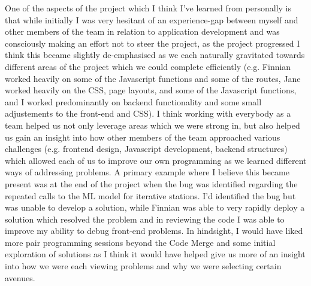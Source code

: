 \documentclass{scrreprt}
\begin{document}
One of the aspects of the project which I think I've learned from personally is that while initially I was very hesitant of an experience-gap between myself and other members of the team in relation to application development and was consciously making an effort not to steer the project, as the project progressed I think this became slightly de-emphasised as we each naturally gravitated towards different areas of the project which we could complete efficiently (e.g. Finnian worked heavily on some of the Javascript functions and some of the routes, Jane worked heavily on the CSS, page layouts, and some of the Javascript functions, and I worked predominantly on backend functionality and some small adjustements to the front-end and CSS). I think working with everybody as a team helped us not only leverage areas which we were strong in, but also helped us gain an insight into how other members of the team approached various challenges (e.g. frontend design, Javascript development, backend structures) which allowed each of us to improve our own programming as we learned different ways of addressing problems. A primary example where I believe this became present was at the end of the project when the bug was identified regarding the repeated calls to the ML model for iterative stations. I'd identified the bug but was unable to develop a solution, while Finnian was able to very rapidly deploy a solution which resolved the problem and in reviewing the code I was able to improve my ability to debug front-end problems. In hindsight, I would have liked more pair programming sessions beyond the Code Merge and some initial exploration of solutions as I think it would have helped give us more of an insight into how we were each viewing problems and why we were selecting certain avenues.\\
\\
\end{document}

